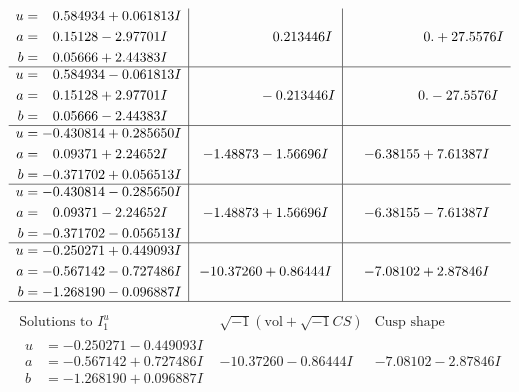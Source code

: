 \documentclass[1p]{elsarticle_modified}
\theoremstyle{definition}
\newcommand{\I}{\sqrt{-1}}
\begin{document}
$$\begin{array}{c|c|c}
\begin{aligned}
u &= \phantom{-}0.584934 + 0.061813 I \\
a &= \phantom{-}0.15128 - 2.97701 I \\
b &= \phantom{-}0.05666 + 2.44383 I\end{aligned}
 & \phantom{-0.000000 -}0.213446 I & \phantom{-0.000000 -}0. + 27.5576 I \\ \hline\begin{aligned}
u &= \phantom{-}0.584934 - 0.061813 I \\
a &= \phantom{-}0.15128 + 2.97701 I \\
b &= \phantom{-}0.05666 - 2.44383 I\end{aligned}
 & \phantom{-0.000000 } -0.213446 I & \phantom{-0.000000 } 0. - 27.5576 I \\ \hline\begin{aligned}
u &= -0.430814 + 0.285650 I \\
a &= \phantom{-}0.09371 + 2.24652 I \\
b &= -0.371702 + 0.056513 I\end{aligned}
 & -1.48873 - 1.56696 I & -6.38155 + 7.61387 I \\ \hline\begin{aligned}
u &= -0.430814 - 0.285650 I \\
a &= \phantom{-}0.09371 - 2.24652 I \\
b &= -0.371702 - 0.056513 I\end{aligned}
 & -1.48873 + 1.56696 I & -6.38155 - 7.61387 I \\ \hline\begin{aligned}
u &= -0.250271 + 0.449093 I \\
a &= -0.567142 - 0.727486 I \\
b &= -1.268190 - 0.096887 I\end{aligned}
 & -10.37260 + 0.86444 I & -7.08102 + 2.87846 I\\
 \hline 
 \end{array}$$\newpage$$\begin{array}{c|c|c}  
\text{Solutions to }I^u_{1}& \I (\text{vol} + \sqrt{-1}CS) & \text{Cusp shape}\\
 \hline 
\begin{aligned}
u &= -0.250271 - 0.449093 I \\
a &= -0.567142 + 0.727486 I \\
b &= -1.268190 + 0.096887 I\end{aligned}
 & -10.37260 - 0.86444 I & -7.08102 - 2.87846 I \\ \hline\begin{aligned}

\end{aligned}
\end{array}$$
\end{document}
